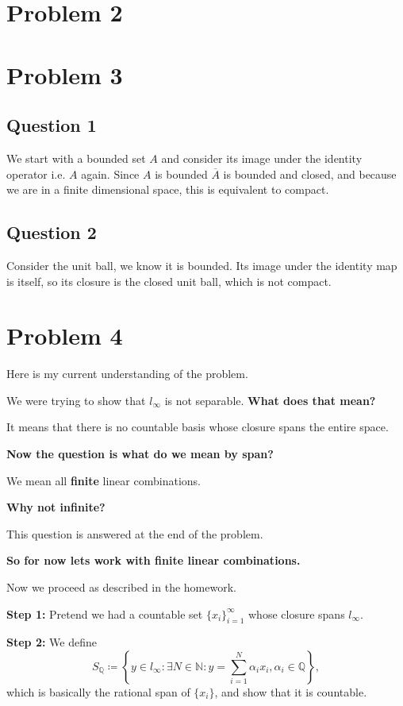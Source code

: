 \documentclass[12pt]{article}%
\begin{document}
\section*{Problem 2}
\section*{Problem 3}
\subsection*{Question 1}
We start with a bounded set $A$ and consider its image under the
identity operator i.e. $A$ again. Since $A$ is bounded $\overline{A}$ is
bounded and closed, and because we are in a finite dimensional space, this is
equivalent to compact.
\subsection*{Question 2}
Consider the unit ball, we know it is bounded. Its image under the identity map
is itself, so its closure is the closed unit ball, which is not compact.
\section*{Problem 4}
Here is my current understanding of the problem.

We were trying to show that $l_\infty$ is not separable. \textbf{What does that mean?}

It means that there is no countable basis whose closure spans the
entire space.

\textbf{Now the question is what do we mean by span?}

We mean all \textbf{finite} linear combinations.

\textbf{Why not infinite?}

This question is answered at the end of the problem.

\textbf{So for now lets work with finite linear combinations.}

Now we proceed as described in the homework.

\textbf{Step 1:} Pretend we had a countable set $\{x_i\}_{i=1}^\infty$ whose
closure spans $l_\infty$.

\textbf{Step 2:} We define
\[
	S_\mathbb{Q}\coloneqq\left\{ y\in l_\infty : \exists N \in \mathbb{N}:
	y=\sum_{i=1}^N \alpha_ix_i, \alpha_i \in \mathbb{Q}\right\},
\]
which is basically the rational span of $\{x_i\}$, and show that it is
countable.
\end{document}

